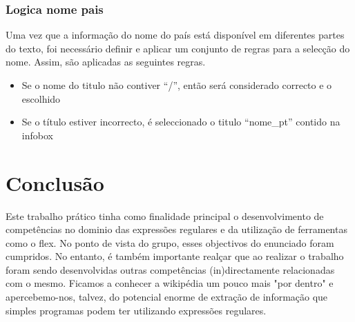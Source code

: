 \documentclass[12pt,a4paper]{report}
\begin{document}
\subsection{Logica nome pais}
Uma vez que a informação do nome do país está disponível em diferentes partes do texto, foi necessário definir e aplicar um conjunto de regras para a selecção do nome. Assim, são aplicadas as seguintes regras.
\begin{itemize}
\item{Se o nome do titulo não contiver ``/'', então será considerado correcto e o escolhido}
\item{Se o título estiver incorrecto, é seleccionado o titulo ``nome\_pt'' contido na infobox}
\end{itemize}
\chapter{Conclusão}
Este trabalho prático tinha como finalidade principal o desenvolvimento de competências no dominio das expressões regulares e da utilização de ferramentas como o flex. No ponto de vista do grupo, esses objectivos do enunciado foram cumpridos. No entanto, é também importante realçar que ao realizar o trabalho foram sendo desenvolvidas outras competências (in)directamente relacionadas com o mesmo. Ficamos a conhecer a wikipédia um pouco mais "por dentro" e apercebemo-nos, talvez, do potencial enorme de extração de informação que simples programas podem ter utilizando expressões regulares. 
\end{document}

